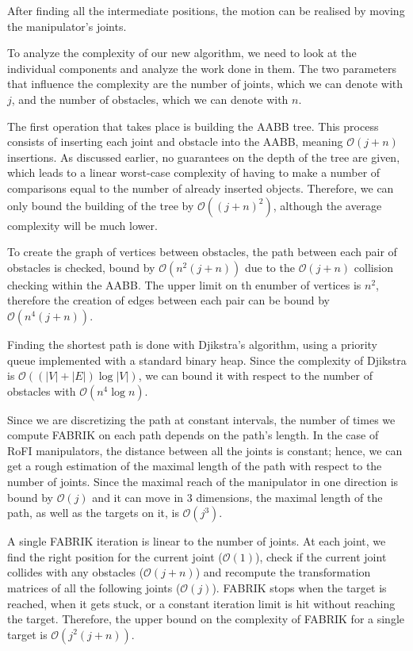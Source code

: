 After finding all the intermediate positions, the motion can be realised by moving the manipulator's joints.

To analyze the complexity of our new algorithm, we need to look at the individual components and analyze the work done in them. The two parameters that influence the complexity are the number of joints, which we can denote with $j$, and the number of obstacles, which we can denote with $n$.

The first operation that takes place is building the AABB tree. This process consists of inserting each joint and obstacle into the AABB, meaning $\mathcal{O}(j + n)$ insertions. As discussed earlier, no guarantees on the depth of the tree are given, which leads to a linear worst-case complexity of having to make a number of comparisons equal to the number of already inserted objects. Therefore, we can only bound the building of the tree by $\mathcal{O}({(j+n)}^2)$, although the average complexity will be much lower.

To create the graph of vertices between obstacles, the path between each pair of obstacles is checked, bound by $\mathcal{O}(n^2 (j+n))$ due to the $\mathcal{O}(j+n)$ collision checking within the AABB. The upper limit on th enumber of vertices is $n^2$, therefore the creation of edges between each pair can be bound by $\mathcal{O}(n^4 (j+n))$.

Finding the shortest path is done with Djikstra's algorithm, using a priority queue implemented with a standard binary heap. Since the complexity of Djikstra is $\mathcal{O}((|V|+|E|) \log{|V|})$, we can bound it with respect to the number of obstacles with $\mathcal{O}(n^4 \log{n})$.

Since we are discretizing the path at constant intervals, the number of times we compute FABRIK on each path depends on the path's length. In the case of RoFI manipulators, the distance between all the joints is constant; hence, we can get a rough estimation of the maximal length of the path with respect to the number of joints. Since the maximal reach of the manipulator in one direction is bound by $\mathcal{O}(j)$ and it can move in 3 dimensions, the maximal length of the path, as well as the targets on it, is $\mathcal{O}(j^3)$.

A single FABRIK iteration is linear to the number of joints. At each joint, we find the right position for the current joint ($\mathcal{O}(1)$), check if the current joint collides with any obstacles ($\mathcal{O}(j+n)$) and recompute the transformation matrices of all the following joints ($\mathcal{O}(j)$). FABRIK stops when the target is reached, when it gets stuck, or a constant iteration limit is hit without reaching the target. Therefore, the upper bound on the complexity of FABRIK for a single target is $\mathcal{O}(j^2(j+n))$.

